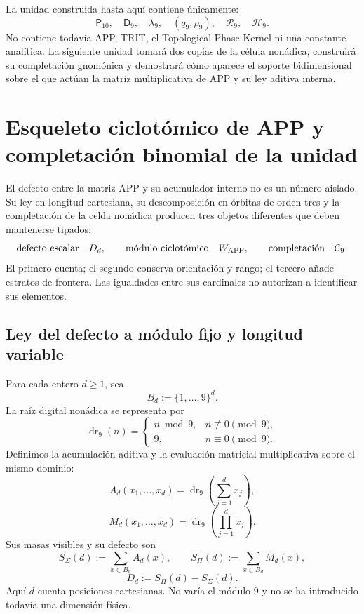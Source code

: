 La unidad construida hasta aquí contiene únicamente:
\[
 \mathsf P_{10},\quad
 \mathsf D_9,\quad
 \lambda_9,\quad
 (q_9,\rho_9),\quad
 \mathcal R_9,\quad
 \mathcal H_9.
\]
No contiene todavía APP, TRIT, el Topological Phase Kernel ni una constante
analítica. La siguiente unidad tomará dos copias de la célula nonádica,
construirá su completación gnomónica y demostrará cómo aparece el soporte
bidimensional sobre el que actúan la matriz multiplicativa de APP y su ley
aditiva interna.



\section{Esqueleto ciclotómico de APP y completación binomial de la unidad}
\label{p12-83-c1-s5:chap:app-esqueleto-completacion}

El defecto entre la matriz APP y su acumulador interno no es un número
aislado. Su ley en
longitud cartesiana, su descomposición en órbitas de orden tres y la
completación de la celda nonádica producen tres objetos diferentes que deben
mantenerse tipados:
\[
 \text{defecto escalar}\quad D_d,
 \qquad
 \text{módulo ciclotómico}\quad W_{\rm APP},
 \qquad
 \text{completación}\quad\overline{\mathcal C}_9.
\]
El primero cuenta; el segundo conserva orientación y rango; el tercero añade
estratos de frontera. Las igualdades entre sus cardinales no autorizan a
identificar sus elementos.

\subsection{Ley del defecto a módulo fijo y longitud variable}

Para cada entero \(d\geq1\), sea
\[
 B_d:=\{1,\ldots,9\}^d.
\]
La raíz digital nonádica se representa por
\[
 \operatorname{dr}_9(n)=
 \begin{cases}
 n\bmod9,&n\not\equiv0\pmod9,\\
 9,&n\equiv0\pmod9.
 \end{cases}
\]
Definimos la acumulación aditiva y la evaluación matricial multiplicativa
sobre el mismo dominio:
\[
 A_d(x_1,\ldots,x_d)
 =\operatorname{dr}_9\!\left(\sum_{j=1}^d x_j\right),
\]
\[
 M_d(x_1,\ldots,x_d)
 =\operatorname{dr}_9\!\left(\prod_{j=1}^d x_j\right).
\]
Sus masas visibles y su defecto son
\[
 S_\Sigma(d):=\sum_{x\in B_d}A_d(x),
 \qquad
 S_\Pi(d):=\sum_{x\in B_d}M_d(x),
\]
\[
 D_d:=S_\Pi(d)-S_\Sigma(d).
\]
Aquí \(d\) cuenta posiciones cartesianas. No varía el módulo \(9\) y no se
ha introducido todavía una dimensión física.

